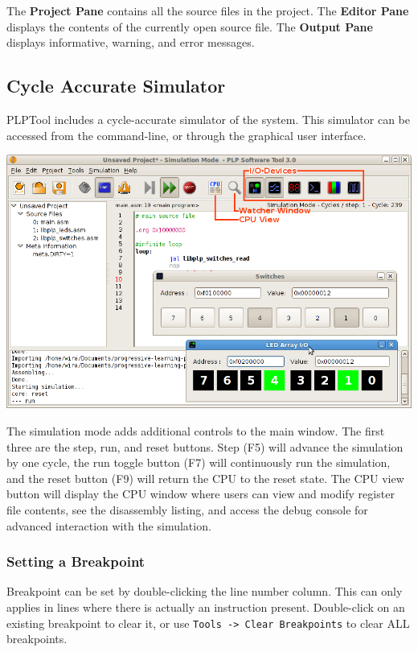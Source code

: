 \documentclass{article}
\begin{document}
The \textbf{Project Pane} contains all the source files in the project. 
The \textbf{Editor Pane} displays the contents of the currently open source 
file. The \textbf{Output Pane} displays informative, warning, and error 
messages. 
\subsection{Cycle Accurate Simulator}
PLPTool includes a cycle-accurate simulator of the system. This simulator can be accessed from the command-line, or through the graphical user interface. 

\begin{center}
\includegraphics[scale=0.5]{../../images/plptool/plptool30_simulation_mode.png}
\end{center}

The simulation mode adds additional controls to the main window. The first three are the step, run, and reset buttons. Step (F5) will advance the simulation by one cycle, the run toggle button (F7) will continuously run the simulation, and the reset button (F9) will return the CPU to the reset state. The CPU view button will display the CPU window where users can view and modify register file contents, see the disassembly listing, and access the debug console for advanced interaction with the simulation. 
\subsubsection{Setting a Breakpoint}
Breakpoint can be set by double-clicking the line number column. This can only 
applies in lines where there is actually an instruction present. 
Double-click on an existing breakpoint to clear it, or use 
\verb+Tools -> Clear Breakpoints+ to clear ALL breakpoints. 
\end{document}

